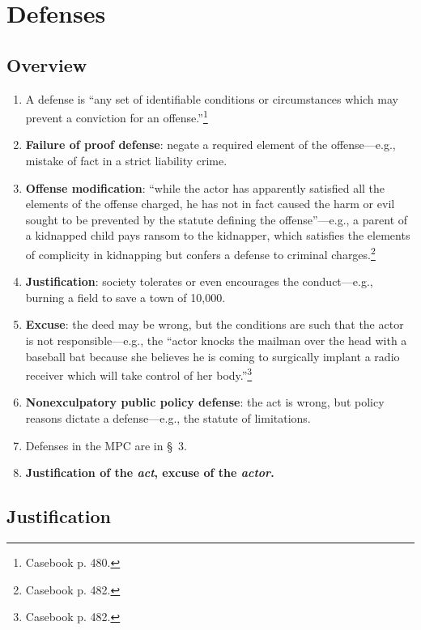 \section{Defenses}

\subsection{Overview}

\begin{enumerate}
    \item A defense is ``any set of identifiable conditions or circumstances 
    which may prevent a conviction for an offense.''\footnote{Casebook p. 480.}
    \item \textbf{Failure of proof defense}: negate a required element of the 
    offense---e.g., mistake of fact in a strict liability crime.
    \item \textbf{Offense modification}: ``while the actor has apparently 
    satisfied all the elements of the offense charged, he has not in fact 
    caused the harm or evil sought to be prevented by the statute defining the 
    offense''---e.g., a parent of a kidnapped child pays ransom to the 
    kidnapper, which satisfies the elements of complicity in kidnapping but 
    confers a defense to criminal charges.\footnote{Casebook p. 482.}
    \item \textbf{Justification}: society tolerates or even encourages the 
    conduct---e.g., burning a field to save a town of 10,000. 
    \item \textbf{Excuse}: the deed may be wrong, but the conditions are such 
    that the actor is not responsible---e.g., the ``actor knocks the mailman 
    over the head with a baseball bat because she believes he is coming to 
    surgically implant a radio receiver which will take control of her 
    body.''\footnote{Casebook p. 482.}
    \item \textbf{Nonexculpatory public policy defense}: the act is wrong, but 
    policy reasons dictate a defense---e.g., the statute of limitations.
    \item Defenses in the MPC are in \S\ 3.
    \item \textbf{Justification of the \emph{act}, excuse of the \emph{actor}.}
\end{enumerate}

\subsection{Justification}

